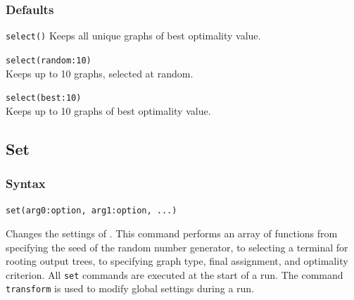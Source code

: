 	\subsubsection{Defaults}
		\texttt{select()} Keeps all unique graphs of best optimality value.
		
	\begin{example}
		\item{\texttt{select(random:10)}\\ Keeps up to 10 graphs, selected at random.}
						
		\item{\texttt{select(best:10)}\\ Keeps up to 10 graphs of best optimality value.}
	\end{example}

\subsection{Set}
	\subsubsection{Syntax}
		\texttt{set(arg0:option, arg1:option, ...)}
	
	\begin{phygdescription}
		{Changes the settings of \phyg. This command performs an array of functions
		from specifying the seed of the random number generator, to selecting a terminal for
		rooting output trees, to specifying  graph type, final assignment, and 
		optimality criterion. All \texttt{set} commands are executed at the start of a run. 
		The command \texttt{transform} is used to modify global settings during a run.}
	\end{phygdescription}
			
